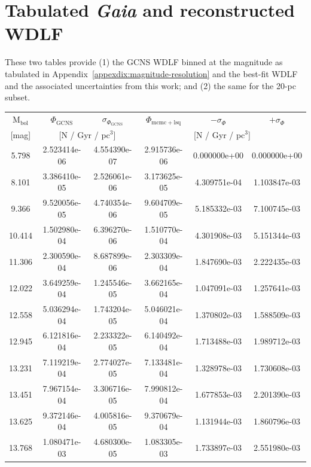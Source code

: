 \documentclass[fleqn,usenatbib]{mnras}
\begin{document}
\section{Tabulated \textit{Gaia} and reconstructed WDLF}
\label{appexdix:reconstructed-wdlf}
These two tables provide (1) the GCNS WDLF binned at the magnitude as tabulated in 
Appendix~\ref{appexdix:magnitude-resolution} and the best-fit WDLF and the
associated uncertainties from this work; and (2) the same for the 20-pc subset.
\begin{table}
    \centering
    \begin{tabular}{c|cc|ccc}
         M$_{\mathrm{bol}}$ & $\Phi_{\mathrm{GCNS}}$ & $\sigma_{\Phi_{\mathrm{GCNS}}}$ & $\Phi_{\mathrm{mcmc + lsq}}$ & $-\sigma_{\Phi}$ & $+\sigma_{\Phi}$ \\
         {[mag]} & \multicolumn{2}{c|}{[N / Gyr / pc$^3$]} & \multicolumn{3}{c}{[N / Gyr / pc$^3$]} \\\hline\hline
        5.798 & 2.523414e-06 & 4.554390e-07 & 2.915736e-06 & 0.000000e+00 & 0.000000e+00 \\ 
        8.101 & 3.386410e-05 & 2.526061e-06 & 3.173625e-05 & 4.309751e-04 & 1.103847e-03 \\ 
        9.366 & 9.520056e-05 & 4.740354e-06 & 9.604709e-05 & 5.185332e-03 & 7.100745e-03 \\ 
        10.414 & 1.502980e-04 & 6.396270e-06 & 1.510770e-04 & 4.301908e-03 & 5.151344e-03 \\ 
        11.306 & 2.300590e-04 & 8.687899e-06 & 2.303309e-04 & 1.847690e-03 & 2.222435e-03 \\ \hline
        12.022 & 3.649259e-04 & 1.245546e-05 & 3.662165e-04 & 1.047091e-03 & 1.257641e-03 \\ 
        12.558 & 5.036294e-04 & 1.743204e-05 & 5.046021e-04 & 1.370802e-03 & 1.588509e-03 \\ 
        12.945 & 6.121816e-04 & 2.233322e-05 & 6.140492e-04 & 1.713488e-03 & 1.989712e-03 \\ 
        13.231 & 7.119219e-04 & 2.774027e-05 & 7.133481e-04 & 1.328978e-03 & 1.730608e-03 \\ 
        13.451 & 7.967154e-04 & 3.306716e-05 & 7.990812e-04 & 1.677853e-03 & 2.201390e-03 \\ \hline
        13.625 & 9.372146e-04 & 4.005816e-05 & 9.370679e-04 & 1.131944e-03 & 1.860796e-03 \\ 
        13.768 & 1.080471e-03 & 4.680300e-05 & 1.083305e-03 & 1.733897e-03 & 2.551980e-03 \\ 

\end{tabular}
\end{table}
\end{document}
